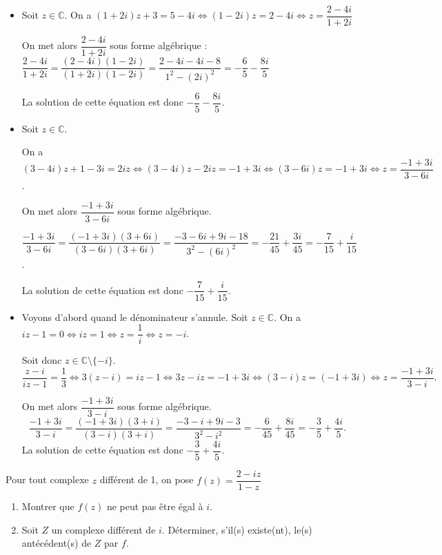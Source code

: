 \documentclass[11pt,fleqn, openany]{book} %
\begin{document}
\begin{solution}
\begin{itemize}
\item Soit \(z\in\mathbb{C}\). On a \((1+2i)z+3=5-4i \Leftrightarrow (1-2i)z=2-4i \Leftrightarrow z=\dfrac{2-4i}{1+2i}\)

On met alors \(\dfrac{2-4i}{1+2i}\) sous forme algébrique : \(\dfrac{2-4i}{1+2i}=\dfrac{(2-4i)(1-2i)}{(1+2i)(1-2i)}=\dfrac{2-4i-4i-8}{1^2-(2i)^2}=-\dfrac{6}{5}-\dfrac{8i}{5}\)

La solution de cette équation est donc \(-\dfrac{6}{5}-\dfrac{8i}{5}\).

\item Soit \(z\in\mathbb{C}\). 

On a \((3-4i)z+1-3i=2iz \Leftrightarrow (3-4i)z-2iz=-1+3i \Leftrightarrow (3-6i)z=-1+3i\Leftrightarrow z=\dfrac{-1+3i}{3-6i}\).

On met alors \(\dfrac{-1+3i}{3-6i}\) sous forme algébrique.

\(\dfrac{-1+3i}{3-6i}=\dfrac{(-1+3i)(3+6i)}{(3-6i)(3+6i)}=\dfrac{-3-6i+9i-18}{3^2-(6i)^2}=-\dfrac{21}{45}+\dfrac{3i}{45}=-\dfrac{7}{15}+\dfrac{i}{15}\).

La solution de cette équation est donc \(-\dfrac{7}{15}+\dfrac{i}{15}\).

\item Voyons d'abord quand le dénominateur s'annule. Soit \(z\in\mathbb{C}\). On a \(iz-1=0 \Leftrightarrow iz=1 \Leftrightarrow z=\dfrac{1}{i} \Leftrightarrow z = -i\).

Soit donc \(z \in \mathbb{C}\setminus \{-i\}\).
\[\dfrac{z-i}{iz-1}=\dfrac{1}{3} \Leftrightarrow 3(z-i)=iz-1 \Leftrightarrow 3z-iz=-1+3i \Leftrightarrow (3-i)z=(-1+3i) \Leftrightarrow z =\dfrac{-1+3i}{3-i}.\]

On met alors \(\dfrac{-1+3i}{3-i}\) sous forme algébrique.
\[\dfrac{-1+3i}{3-i}=\dfrac{(-1+3i)(3+i)}{(3-i)(3+i)}=\dfrac{-3-i+9i-3}{3^2-i^2}=-\dfrac{6}{45}+\dfrac{8i}{45}=-\dfrac{3}{5}+\dfrac{4i}{5}.\]
La solution de cette équation est donc \(-\dfrac{3}{5}+\dfrac{4i}{5}\).\end{itemize}
\end{solution}


\begin{exercise}[topic=cpx03]Pour tout complexe $z$ différent de 1, on pose $f(z)=\dfrac{2-iz}{1-z}$
\begin{enumerate}
\item Montrer que $f(z)$ ne peut pas être égal à $i$.
\item Soit $Z$ un complexe différent de $i$. Déterminer, s'il(s) existe(nt), le(s) antécédent(s) de $Z$ par $f$.
\end{enumerate}

\end{exercise}
\end{document}
